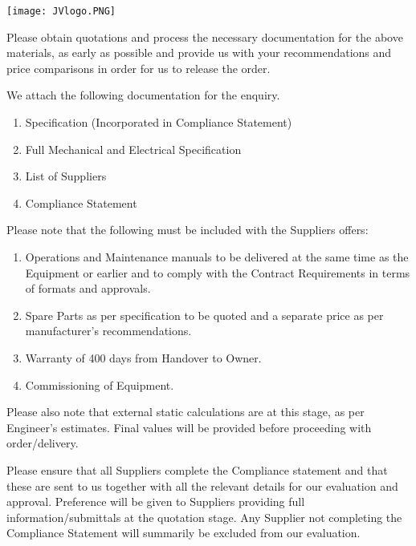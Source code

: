 \documentclass[a4paper,11pt,oneside]{article}
\def\signature{%
 \YL\encl}
\begin{document}
\sffamily
\mbox{}
\texttt{[image: JVlogo.PNG]}
\vspace{1em}

\Date 


\TOMCD


\setlength{\parskip}{\baselineskip}


Please obtain quotations and process the necessary documentation for the above materials, as early as possible and provide us with your recommendations and price comparisons in order for us to release the order. 

We attach the following documentation for the enquiry. 

\begin{enumerate}

\item Specification (Incorporated in Compliance Statement)
\item Full Mechanical and Electrical Specification
\item List of Suppliers
\item Compliance Statement
\end{enumerate}

Please note that the following must be included with the Suppliers offers:

\begin{enumerate}
\item  Operations and Maintenance manuals to be delivered at the same time as the Equipment or earlier and to comply with the Contract Requirements in terms of formats and approvals.
\item Spare Parts as per specification to be quoted and a separate price as per manufacturer's recommendations.
\item Warranty of 400 days from Handover to Owner.
\item Commissioning of Equipment.
\end{enumerate}

Please also note that external static calculations are at this stage, as per Engineer's estimates. Final values will be provided before proceeding with order/delivery.


Please ensure that all Suppliers complete the Compliance statement and that these are sent to us together with all the relevant details for our evaluation and approval. Preference will be given to Suppliers providing full information/submittals at the quotation stage. Any Supplier not completing the Compliance Statement will summarily be excluded from our evaluation.



\signature
\end{document}
